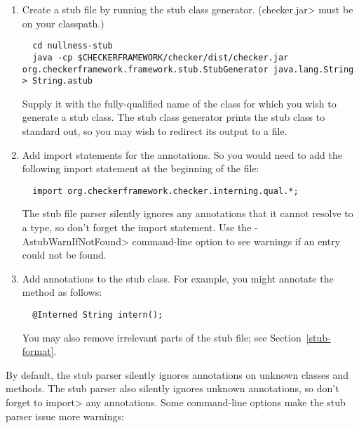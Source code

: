 \begin{enumerate}

\item
  Create a stub file by running the stub class generator.  (\<checker.jar> must be on your classpath.)

\begin{Verbatim}
  cd nullness-stub
  java -cp $CHECKERFRAMEWORK/checker/dist/checker.jar org.checkerframework.framework.stub.StubGenerator java.lang.String > String.astub
\end{Verbatim}

  Supply it with the fully-qualified name of the class for which you wish to
  generate a stub class.  The stub class generator prints the
  stub class to standard out, so you may wish to redirect its output to a
  file.

\item
  Add import statements for the annotations.  So you would need to
add the following import statement at the beginning of the file:

\begin{Verbatim}
  import org.checkerframework.checker.interning.qual.*;
\end{Verbatim}

\noindent
The stub file parser silently ignores any annotations that it cannot
resolve to a type, so don't forget the import statement.
Use the \<-AstubWarnIfNotFound> command-line option to see warnings
if an entry could not be found.

\item
  Add annotations to the stub class.  For example, you might annotate
  the  method as follows:

\begin{Verbatim}
  @Interned String intern();
\end{Verbatim}

  You may also remove irrelevant parts of the stub file; see
  Section~\ref{stub-format}.

\end{enumerate}





By default, the stub parser silently ignores
annotations on unknown classes and methods.
The stub parser also silently ignores unknown annotations, so don't forget to
\<import> any annotations.
Some command-line options make the stub parser issue more warnings:

